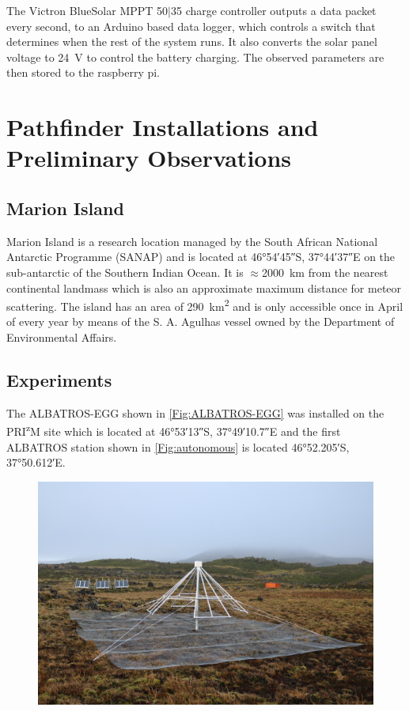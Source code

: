\documentclass{ws-jai}
\begin{document}
The Victron BlueSolar MPPT 50$\vert$35 charge controller outputs a data packet every second, to an Arduino based data logger, which controls a switch that determines when the rest of the system runs. It also converts the solar panel voltage to \SI{24}{\volt} to control the battery charging. The observed parameters are then stored to the raspberry pi.

\section{Pathfinder Installations and Preliminary Observations}
\subsection{Marion Island}
 Marion Island is a research location managed by the South African National Antarctic Programme (SANAP) and is located at \ang{46;54;45}S, \ang{37;44;37}E on the sub-antarctic of the Southern Indian Ocean. It is $\approx$\SI{2000}{\kilo\metre} from the nearest continental landmass which is also an approximate maximum distance for meteor scattering. The island has an area of \SI{290}{\kilo\metre\squared} and is only accessible once in April of every year by means of the S. A. Agulhas vessel owned by the Department of Environmental Affairs.  
 
 \subsection{Experiments}
 The ALBATROS-EGG shown in \autoref{Fig:ALBATROS-EGG} was installed on the PRI\textsuperscript{z}M \cite{2019JAI.....850004P} site which is located at \ang{46;53;13}S, \ang{37;49;10.7}E and the first ALBATROS station shown in \autoref{Fig:autonomous} is located \ang{46;52.205;}S, \ang{37;50.612;}E.\\
 

	\begin{figure}[h]
		\begin{center}
			\includegraphics[width=0.7\linewidth]{Figures/autonomous.jpg}
			\caption{}
			\label{Fig:autonomous}
		\end{center}
	\end{figure}
\end{document}
